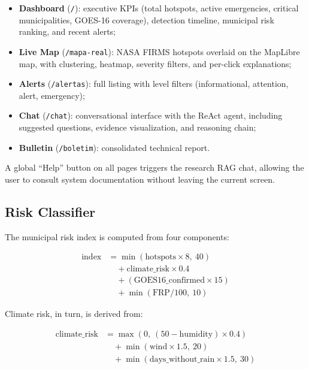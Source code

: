 \documentclass[preprint,12pt,times,numbers]{elsarticle}
\begin{document}
\begin{itemize}
    \item \textbf{Dashboard} (\texttt{/}): executive KPIs (total hotspots, active emergencies, critical municipalities, GOES-16 coverage), detection timeline, municipal risk ranking, and recent alerts;
    \item \textbf{Live Map} (\texttt{/mapa-real}): NASA FIRMS hotspots overlaid on the MapLibre map, with clustering, heatmap, severity filters, and per-click explanations;
    \item \textbf{Alerts} (\texttt{/alertas}): full listing with level filters (informational, attention, alert, emergency);
    \item \textbf{Chat} (\texttt{/chat}): conversational interface with the ReAct agent, including suggested questions, evidence visualization, and reasoning chain;
    \item \textbf{Bulletin} (\texttt{/boletim}): consolidated technical report.
\end{itemize}

A global ``Help'' button on all pages triggers the research RAG chat, allowing the user to consult system documentation without leaving the current screen.

\subsection{Risk Classifier}
\label{sec:risk}

The municipal risk index is computed from four components:

\begin{align}
\text{index} &= \min(\text{hotspots} \times 8,\ 40) \nonumber \\
               &\quad + \text{climate\_risk} \times 0.4 \nonumber \\
               &\quad + (\text{GOES16\_confirmed} \times 15) \nonumber \\
               &\quad + \min(\text{FRP} / 100,\ 10)
\end{align}

Climate risk, in turn, is derived from:

\begin{align}
\text{climate\_risk} &= \max(0,\ (50 - \text{humidity}) \times 0.4) \nonumber \\
                         &\quad + \min(\text{wind} \times 1.5,\ 20) \nonumber \\
                         &\quad + \min(\text{days\_without\_rain} \times 1.5,\ 30)
\end{align}
\end{document}
